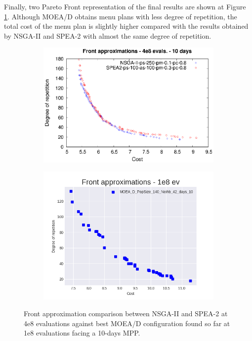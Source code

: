 Finally, two Pareto Front representation of the final results are shown at Figure \ref{fig:front_comp}. Although MOEA/D obtains menu plans with less degree of repetition, the total cost of the menu plan is slightly higher compared with the results obtained by NSGA-II and SPEA-2 with almost the same degree of repetition.
\begin{figure}[H]
\begin{subfigure}{.5\textwidth}
  \centering
  \includegraphics[width=1.0\linewidth]{../references/fronts_10days.eps}
\end{subfigure}%
\begin{subfigure}{.5\textwidth}
  \centering
  \includegraphics[width=1.0\linewidth]{../experiments/plots/fronts/MOEA_D_PopSize_140_Neihb_42_days_10_10.png}
\end{subfigure}
\caption{Front approximation comparison between NSGA-II and SPEA-2 at 4e8 evaluations against best MOEA/D configuration found so far at 1e8 evaluations facing a 10-days MPP.}
\label{fig:front_comp}
\end{figure}